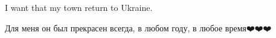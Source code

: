  
 
 
 
 

\qqSecCmt


I want that my town return to Ukraine.


Для меня он был прекрасен всегда, в любом году, в любое время❤️❤️❤️
